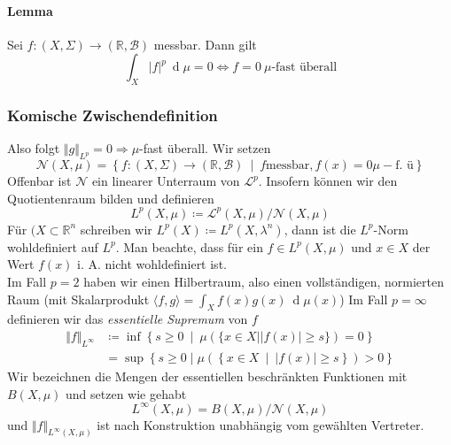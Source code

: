 \documentclass[12pt,a4paper,fleqn]{article}
\def\set#1{{\left\{ #1 \right\}}}
\def\Mid{\ \middle|\ }
\def\d{{\operatorname{d}}}
\begin{document}
\paragraph{Lemma} Sei $f\colon (X, \Sigma) \rightarrow (\mathbb{R}, \mathcal{B})$ messbar. Dann gilt
\begin{displaymath}
\int_X \vert f \vert ^p\ \d\mu = 0 \Leftrightarrow f = 0\ \mu \text{-fast überall}
\end{displaymath}

\subsubsection*{Komische Zwischendefinition} 
Also folgt $\Vert g \Vert_{L^p} = 0 \Rightarrow \mu$-fast überall. Wir setzen
\begin{displaymath}
\mathcal{N}(X, \mu) = \set{f\colon (X, \Sigma) \rightarrow (\mathbb{R}, \mathcal{B}) \Mid f \text{messbar}, f(x) = 0 \mu-\text{f. ü}}
\end{displaymath}
Offenbar ist $\mathcal{N}$ ein linearer Unterraum von $\mathscr{L}^p$. Insofern können wir den Quotientenraum bilden und definieren
\begin{displaymath}
L^p(X, \mu) \coloneqq \mathscr{L}^p(X, \mu)/\mathcal{N}(X, \mu)
\end{displaymath}
Für $(X \subset \mathbb{R}^n$ schreiben wir $L^p(X) \coloneqq L^p(X, \lambda^n)$, dann ist die $L^p$-Norm wohldefiniert auf $L^p$.
Man beachte, dass für ein $f \in L^p(X, \mu)$ und $ x\in X$ der Wert $f(x)$ i. A. nicht wohldefiniert ist.\\
Im Fall $p = 2$ haben wir einen Hilbertraum, also einen vollständigen, normierten Raum (mit Skalarprodukt $\langle f, g\rangle = \int_X f(x)g(x)\ \d\mu(x)$)
Im Fall $ p = \infty$ definieren wir das \textit{essentielle Supremum} von $f$
\begin{align*}
\Vert f \Vert_{L^\infty} &\coloneqq \inf \set{s \geq 0 \Mid \mu(\{x \in X \mid \vert f(x)\vert \geq s\})=0}\\
&= \sup \set{s\geq 0 \mid \mu(\set{x \in X \Mid \vert f(x) \vert \geq s }) > 0 } 
\end{align*}
Wir bezeichnen die Mengen der essentiellen beschränkten Funktionen mit $B(X, \mu)$ und setzen wie gehabt 
\begin{displaymath}
L^\infty(X, \mu) = B(X, \mu)/\mathcal{N}(X, \mu)
\end{displaymath}
und $\Vert f \Vert_{L^\infty (X, \mu)}$ ist nach Konstruktion unabhängig vom gewählten Vertreter.
\end{document}
